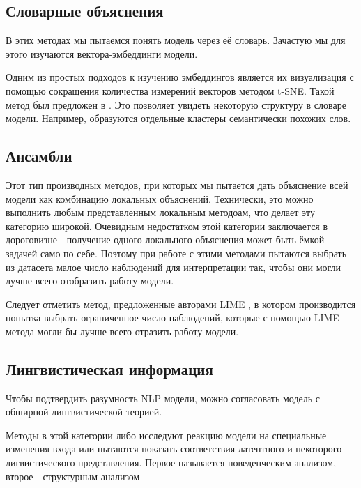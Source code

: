 \subsection{Словарные объяснения}

В этих методах мы пытаемся понять модель через её словарь. Зачастую мы для этого изучаются вектора-эмбеддинги модели.

Одним из простых подходов к изучению эмбеддингов является их визуализация с помощью сокращения количества измерений векторов методом t-SNE. Такой метод был предложен в \cite{liVisualizingUnderstandingNeural2016}. Это позволяет увидеть некоторую структуру в словаре модели. Например, образуются отдельные кластеры семантически похожих слов.

\vspace{8mm}
\subsection{Ансамбли}

Этот тип производных методов, при которых мы пытается дать объяснение всей модели как комбинацию локальных объяснений. Технически, это можно выполнить любым представленным локальным методоам, что делает эту категорию широкой. Очевидным недостатком этой категории заключается в дороговизне - получение одного локального объяснения может быть ёмкой задачей само по себе. Поэтому при работе с этими методами пытаются выбрать из датасета малое число наблюдений для интерпретации так, чтобы они могли лучше всего отобразить работу модели. 

Следует отметить метод, предложенные авторами LIME \cite{ribeiroWhyShouldTrust2016}, в котором производится попытка выбрать ограниченное число наблюдений, которые с помощью LIME метода могли бы лучше всего отразить работу модели.

\vspace{8mm}
\subsection{Лингвистическая информация}

Чтобы подтвердить разумность NLP модели, можно согласовать модель с обширной лингвистической теорией.

Методы в этой категории либо исследуют реакцию модели на специальные изменения входа или пытаются показать соответствия латентного и некоторого лигвистического представления. Первое называется поведенческим анализом, второе - структурным анализом


